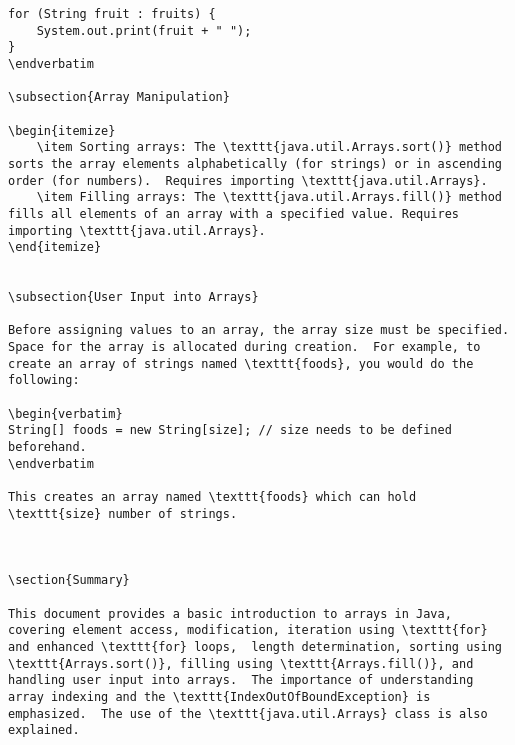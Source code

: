 \documentclass{article}
\begin{document}
\begin{verbatim}
for (String fruit : fruits) {
    System.out.print(fruit + " ");
}
\endverbatim

\subsection{Array Manipulation}

\begin{itemize}
    \item Sorting arrays: The \texttt{java.util.Arrays.sort()} method sorts the array elements alphabetically (for strings) or in ascending order (for numbers).  Requires importing \texttt{java.util.Arrays}.
    \item Filling arrays: The \texttt{java.util.Arrays.fill()} method fills all elements of an array with a specified value. Requires importing \texttt{java.util.Arrays}.
\end{itemize}


\subsection{User Input into Arrays}

Before assigning values to an array, the array size must be specified.  Space for the array is allocated during creation.  For example, to create an array of strings named \texttt{foods}, you would do the following:

\begin{verbatim}
String[] foods = new String[size]; // size needs to be defined beforehand.
\endverbatim

This creates an array named \texttt{foods} which can hold \texttt{size} number of strings.



\section{Summary}

This document provides a basic introduction to arrays in Java, covering element access, modification, iteration using \texttt{for} and enhanced \texttt{for} loops,  length determination, sorting using \texttt{Arrays.sort()}, filling using \texttt{Arrays.fill()}, and handling user input into arrays.  The importance of understanding array indexing and the \texttt{IndexOutOfBoundException} is emphasized.  The use of the \texttt{java.util.Arrays} class is also explained.



\end{verbatim}
\end{document}
